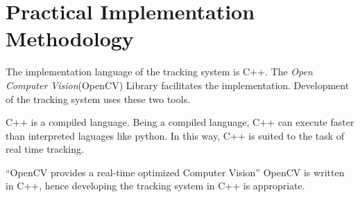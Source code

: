 \section{Practical Implementation Methodology}
  The implementation language of the tracking system is C++.
  The \textit{Open Computer Vision}(OpenCV) Library facilitates the implementation.
  Development of the tracking system uses these two tools.

  C++ is a compiled language.
  Being a compiled language, C++ can execute faster than interpreted laguages like python.
  In this way, C++ is suited to the task of real time tracking.

  ``OpenCV provides a real-time optimized Computer Vision''
  OpenCV is written in C++, hence developing the tracking system in C++ is appropriate.


